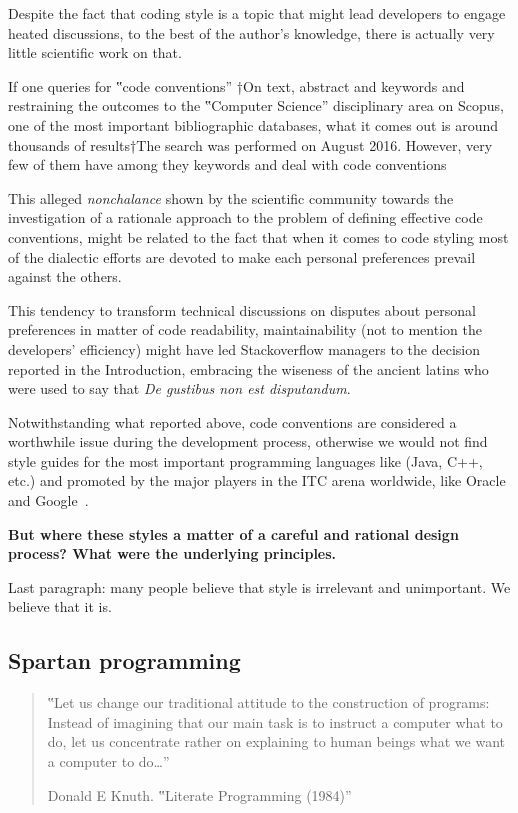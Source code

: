 Despite the fact that coding style is a topic that might lead developers to
engage heated discussions, to the best of the author's knowledge, there is
actually very little scientific work on that.

If one queries for ‟code conventions” †{On text, abstract and keywords and
restraining the outcomes to the ‟Computer Science” disciplinary area} on
Scopus, one of the most important bibliographic
databases, what it comes out is around thousands of results†{The search was
performed on August 2016}. However, very few of them have  among they keywords and deal with code conventions

This alleged \emph{nonchalance} shown by the scientific community towards the
investigation of a rationale approach to the problem of defining effective code
conventions, might be related to the fact that when it comes to code styling
most of the dialectic efforts are devoted
to make each personal preferences prevail against the others.

This tendency to transform technical discussions on disputes about personal preferences
in matter of code readability, maintainability (not to mention the developers' efficiency) might
have led Stackoverflow managers to the decision reported in the Introduction, embracing the
wiseness of the ancient latins who were used to say that \emph{De gustibus non est disputandum}.

Notwithstanding what reported above, code conventions are considered a worthwhile issue during
the development process, otherwise we would not find style guides for the most important
programming languages like (Java, C++, etc.) and promoted by the major players in
the ITC arena worldwide, like Oracle and Google~\cite{}.

\textbf{But where these styles a matter of a careful and rational design process?
What were the underlying principles.}

Last paragraph: many people believe that style is irrelevant and unimportant.
We believe that it is.

\subsection{Spartan programming}

\begin{quote}
  ‟Let us change our traditional attitude to the construction of programs:
  Instead of imagining that our main task is to instruct a computer what to do,
  let us concentrate rather on explaining to human beings what we want a computer
  to do…”
  \begin{flushright}
   \upshape Donald E Knuth. ‟Literate Programming (1984)”
  \end{flushright}
\end{quote}

